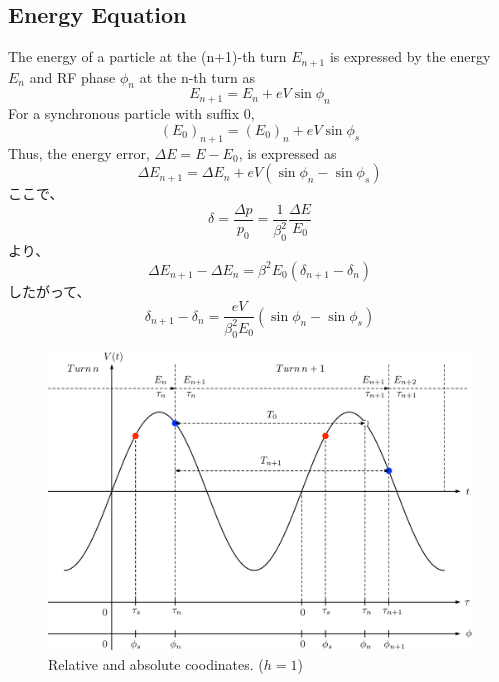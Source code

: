 \documentclass[10pt,a4paper]{ltjsarticle}
\begin{document}
\subsection{Energy Equation}
The energy of a particle at the (n+1)-th turn $E_{n+1}$ is expressed by the energy $E_n$ and RF phase $\phi_n$ at the n-th turn as
%
\begin{equation}
    E_{n+1} = E_n + e V \sin\phi_n
\end{equation}
%
For a synchronous particle with suffix 0,
%
\begin{equation}
    (E_0)_{n+1} = (E_0)_n + e V \sin\phi_s
\end{equation}
%
Thus, the energy error, $\Delta E = E - E_0$, is expressed as
%
\begin{equation}
    \Delta E_{n+1} = \Delta E_n + e V (\sin\phi_n - \sin\phi_s)
\end{equation}
%
ここで、
%
\begin{equation}
    \delta = \frac{\Delta p}{p_0} = \frac{1}{\beta_0^2}\frac{\Delta E}{E_0}
\end{equation}
%
より、
%
\begin{equation}
    \Delta E_{n+1} - \Delta E_n = \beta^2 E_0 (\delta_{n+1} - \delta_n)
\end{equation}
%
したがって、
%
\begin{equation}
    \delta_{n+1} - \delta_n = \frac{e V}{\beta_0^2 E_0}(\sin\phi_n -\sin\phi_s)
\end{equation}
%

\begin{figure}[hbt]
    \begin{center}
      \includegraphics[width=15cm,clip]{coordinates.pdf}
      \caption{Relative and absolute coodinates. ($h=1$)}
      \label{coordinates}
    \end{center}
  \end{figure}
\end{document}
